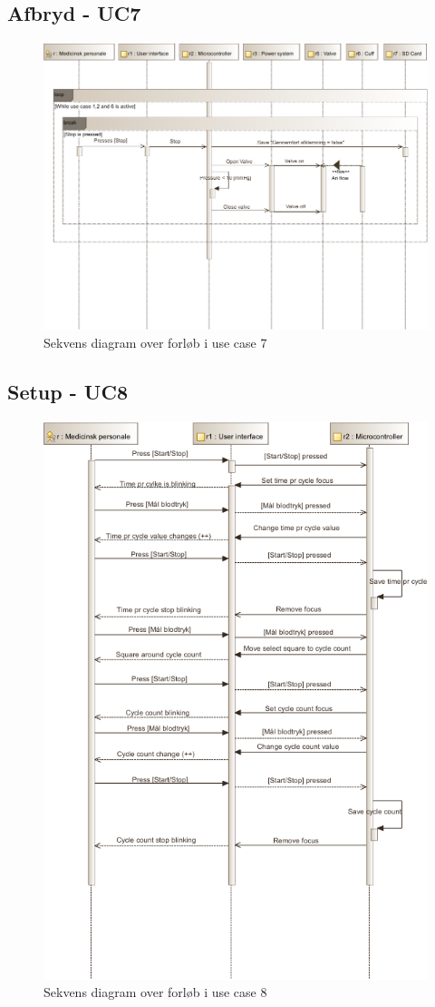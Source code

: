\subsection{Afbryd - UC7}
\begin{figure}[H]
	\includegraphics[width=\textwidth]{SystemArkitektur/pdfs/SD_UC7-crop.pdf}
\caption{Sekvens diagram over forløb i use case 7}
\end{figure}
\newpage

\subsection{Setup - UC8}
\begin{figure}[H]
	\includegraphics[width=\textwidth]{SystemArkitektur/pdfs/SD_UC8-crop.pdf}
\caption{Sekvens diagram over forløb i use case 8}
\end{figure}
\newpage

